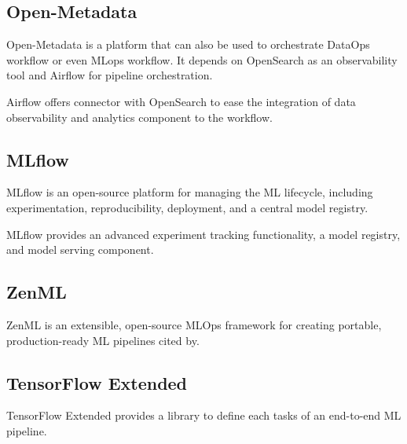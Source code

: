 \subsection{Open-Metadata}\label{subsec:openmetadata}
Open-Metadata is a platform that can also be used to orchestrate DataOps workflow or even MLops workflow.
It depends on OpenSearch as an observability tool and Airflow for pipeline orchestration.

Airflow offers connector with OpenSearch to ease the integration of data observability and analytics component to the workflow.

\subsection{MLflow}
MLflow is an open-source platform for managing the ML lifecycle, including experimentation, reproducibility,
deployment, and a central model registry.\cite{mlflow}

MLflow provides an advanced experiment tracking functionality, a model registry, and
model serving component\cite{Kreuzberger2022MachineLO}.

\subsection{ZenML}
ZenML is an extensible, open-source MLOps framework for creating portable, production-ready ML pipelines cited by\cite{blockchain-mlops}.

\subsection{TensorFlow Extended}
TensorFlow Extended provides a library to define each tasks of an end-to-end ML
pipeline\cite{Kreuzberger2022MachineLO}.
